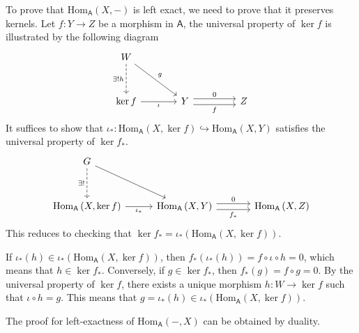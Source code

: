 \begin{prf}
    To prove that $\mathrm{Hom}_{\mathsf{A}}(X,-)$ is left exact, we need to prove that it preserves kernels. Let $f:Y\to Z$ be a morphism in $\mathsf{A}$, the universal property of $\ker f$ is illustrated by the following diagram
    \[
        \begin{tikzcd}[column sep={6em, between origins}, ampersand replacement=\&]
            W \arrow[rd, "g"] \arrow[d, "\exists!h"', dashed] \&                   \&   \\[+3ex]
            \ker f \arrow[r, "\iota"']                \&Y \arrow[r, "f"', shift right=0.7ex] \arrow[r, "0", shift left=0.7ex] \& Z
        \end{tikzcd}
    \]
    It suffices to show that $\iota_*:\mathrm{Hom}_{\mathsf{A}}\left(X,\ker f \right)\hookrightarrow \mathrm{Hom}_{\mathsf{A}}\left(X,Y\right)$ satisfies the universal property of $\ker f_*$. 
    \[
        \begin{tikzcd}[column sep={10em, between origins}, ampersand replacement=\&]
            G \arrow[rd, ""] \arrow[d, "\exists!"', dashed] \&                   \&   \\[+3ex]
            \mathrm{Hom}_{\mathsf{A}}\left(X,\ker f\right) \arrow[r, "\iota_*"']                \&\mathrm{Hom}_{\mathsf{A}}\left(X,Y\right) \arrow[r, "f_*"', shift right=0.7ex] \arrow[r, "0", shift left=0.7ex] \& \mathrm{Hom}_{\mathsf{A}}\left(X,Z\right)
        \end{tikzcd}
    \]
    This reduces to checking that $\ker f_*=\iota_*\left(\mathrm{Hom}_{\mathsf{A}}\left(X,\ker f \right)\right)$. 
    
    If $\iota_*(h)\in\iota_*\left(\mathrm{Hom}_{\mathsf{A}}\left(X,\ker f \right)\right)$, then $f_*\left(\iota_*(h)\right)=f\circ \iota\circ h=0$, which means that $h\in \ker f_*$. Conversely, if $g\in \ker f_*$, then $f_*(g)=f\circ g=0$. By the universal property of $\ker f$, there exists a unique morphism $h:W\to \ker f$ such that $\iota\circ h=g$. This means that $g=\iota_*(h)\in \iota_*\left(\mathrm{Hom}_{\mathsf{A}}\left(X,\ker f \right)\right)$.

    The proof for left-exactness of $\mathrm{Hom}_{\mathsf{A}}(-,X)$ can be obtained by duality.
\end{prf}



